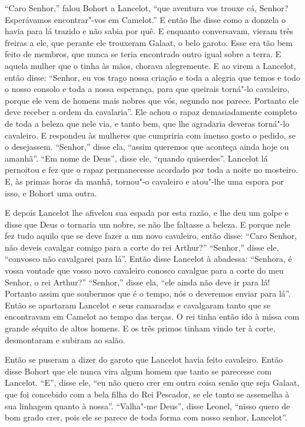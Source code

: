 “Caro Senhor,” falou Bohort a Lancelot, “que aventura vos trouxe cá, Senhor?
Esperávamos encontrar"-vos em Camelot.” E então lhe disse como a donzela o havia
para lá trazido e não sabia por quê. E enquanto conversavam, vieram três
freiras a ele, que perante ele trouxeram Galaat, o belo garoto. Esse era tão
bem feito de membros, que nunca se teria encontrado outro igual sobre a terra.
E aquela mulher que o tinha às mãos, chorava alegremente. E ao virem a
Lancelot, então disse: “Senhor, eu vos trago nossa criação e toda a alegria
que temos e todo o nosso consolo e toda a nossa esperança, para que queirais
torná"-lo cavaleiro, porque ele vem de homens mais nobres que vós, segundo nos
parece. Portanto ele deve receber a ordem da cavalaria”. Ele achou o rapaz
demasiadamente completo de toda a beleza que nele via, e tanto bem, que lhe
agradaria deveras torná"-lo cavaleiro. E respondeu às mulheres que cumpriria com
imenso gosto o pedido, se o desejassem. “Senhor,” disse ela, “assim queremos
que aconteça ainda hoje ou amanhã”. “Em nome de Deus”, disse ele, “quando
quiserdes”. Lancelot lá pernoitou e fez que o rapaz permanecesse acordado por
toda a noite no mosteiro. E, às primas horas da manhã, tornou"-o cavaleiro e
atou"-lhe uma espora por isso, e Bohort uma outra.

E depois Lancelot lhe afivelou sua espada por esta razão, e lhe deu um golpe e
disse que Deus o tornaria um nobre, se não lhe faltasse a beleza. E porque nele
fez tudo aquilo que se deve fazer a um novo cavaleiro, então disse: “Caro
Senhor, não deveis cavalgar comigo para a corte do rei Arthur?”
“Senhor,” disse ele, “convosco não cavalgarei para lá”. Então disse Lancelot à
abadessa: “Senhora, é vossa vontade que vosso novo cavaleiro conosco cavalgue
para a corte do meu Senhor, o rei Arthur?” “Senhor,” disse ela, “ele ainda não
deve ir para lá! Portanto assim que soubermos que é o tempo, nós o deveremos
enviar para lá”. Então se apartaram Lancelot e seus camaradas e cavalgaram
tanto que se encontravam em Camelot ao tempo das terças. O rei tinha então ido à
missa com grande séquito de altos homens. E os três primos tinham vindo ter à
corte, desmontaram e subiram ao salão. 

Então se puseram a dizer do garoto que Lancelot havia feito cavaleiro. Então
disse Bohort que ele nunca vira algum homem que tanto se parecesse com
Lancelot. “E”, disse ele, “eu não quero crer em outra coisa senão que seja
Galaat, que foi concebido com a bela filha do Rei Pescador, se ele tanto se
assemelha à sua linhagem quanto à nossa”. “Valha"-me Deus”, disse Leonel, “nisso
quero de bom grado crer, pois ele se parece de toda forma com nosso senhor, Lancelot”.

